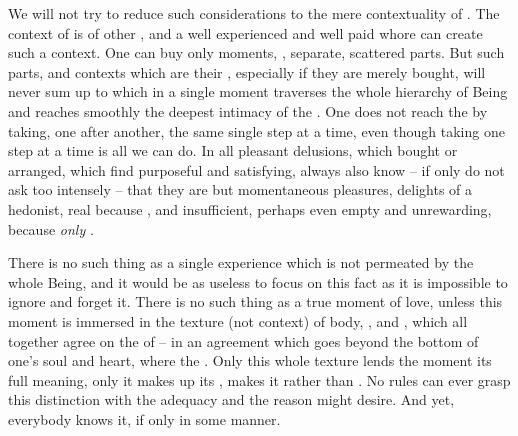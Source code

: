 \pa %
We will not try to reduce such considerations to the mere contextuality of
.  The context of  is  of
other , and a well experienced and well paid whore can create
such a context.  One can buy only moments, , separate, scattered
parts.  But such parts, and contexts which are their , especially
if they are merely bought, will never sum up to  which in a
single moment traverses the whole hierarchy of Being and reaches smoothly the
deepest intimacy of the .  One does not reach the
 by taking, one after another, the same single step at a time, even
though taking one step at a time is all we can do.
In all pleasant delusions, which  bought or arranged, which  find
purposeful and satisfying,  always also know -- if only  do not ask
too intensely -- that they are but momentaneous pleasures, delights of a
hedonist, real because , and insufficient, perhaps even empty and
unrewarding, because {\em only} .

\pa There is no such thing as a single experience which is not permeated by
the whole Being, and it would be as useless to focus on this fact as it is
impossible to ignore and forget it.  There is no such thing as a true moment of
love, unless this moment is immersed in the texture (not context) of body,
,  and , which all together agree on the
 of  -- in an agreement which goes beyond the bottom of
one's soul and heart, where the .  Only this whole
texture lends the  moment its full meaning, only it makes up its
, makes it  rather than
. No  rules can ever grasp this distinction with the
adequacy and  the  reason might desire. And yet,
everybody knows it, if only in some   manner.


